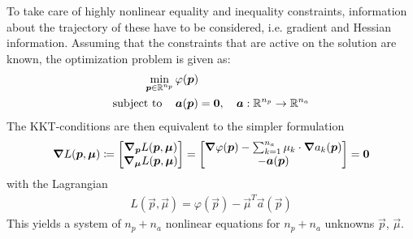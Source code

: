 		To take care of highly nonlinear equality and inequality constraints, information about the trajectory of these have to be considered, i.e. gradient and Hessian information. Assuming that the constraints that are active on the solution are known, the optimization problem is given as:
		\begin{align*}
			\min_{\bm{p} \in \mathbb{R}^{n_p}} &\, \varphi(\bm{p}) \\
			\mathrm{subject~to}\quad &\, \bm{a}(\bm{p}) = \bm{0},\quad \bm{a} : \mathbb{R}^{n_p} \to \mathbb{R}^{n_a}
		\end{align*}
		The KKT-conditions are then equivalent to the simpler formulation
		\begin{align*}
			\grad{L}(\bm{p}, \bm{\mu}) \coloneqq
				\begin{bmatrix}
					\grad_{\bm{p}}L(\bm{p}, \bm{\mu}) \\
					\grad_{\bm{\mu}}L(\bm{p}, \bm{\mu})
				\end{bmatrix}
			=
				\begin{bmatrix}
					\grad{\varphi}(\bm{p}) - \sum_{k = 1}^{n_a} \mu_k \cdot \grad{a_k}(\bm{p}) \\
					-\bm{a}(\bm{p})
				\end{bmatrix}
			= \bm{0}
		\end{align*}
		with the Lagrangian
		\begin{align*}
			L(\vec{p}, \vec{\mu}) = \varphi(\vec{p}) - \vec{\mu}^T \vec{a}(\vec{p})
		\end{align*}
		This yields a system of \( n_p + n_a \) nonlinear equations for \( n_p + n_a \) unknowns \( \vec{p} \), \( \vec{\mu} \).

